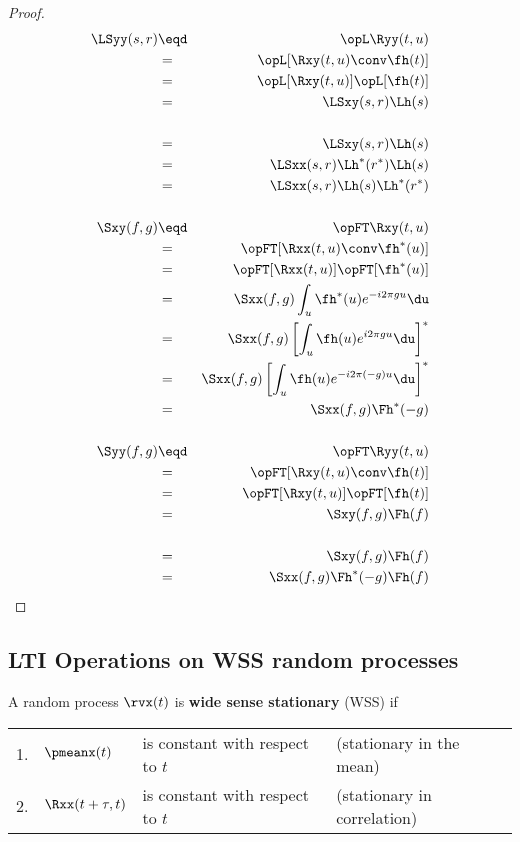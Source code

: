 \begin{proof}
\begin{eqnarray*}
   \LSyy(s,r)
     &\eqd& \opL\Ryy(t,u)
   \\&=&    \opL[\Rxy(t,u) \conv \fh(t)]
   \\&=&    \opL[\Rxy(t,u)]\opL[\fh(t)]
   \\&=&    \LSxy(s,r) \Lh(s)
\\
   \\&=&    \LSxy(s,r) \Lh(s)
   \\&=&    \LSxx(s,r) \Lh^\ast(r^\ast)\Lh(s)
   \\&=&    \LSxx(s,r) \Lh(s) \Lh^\ast(r^\ast)
\\ \\
   \Sxy(f,g)
     &\eqd& \opFT\Rxy(t,u)
   \\&=&    \opFT[\Rxx(t,u) \conv \fh^\ast(u)]
   \\&=&    \opFT[\Rxx(t,u)]\opFT[\fh^\ast(u)]
   \\&=&    \Sxx(f,g) \int_u \fh^\ast(u) e^{-i2\pi g u} \du
   \\&=&    \Sxx(f,g) \left[\int_u \fh(u) e^{i2\pi g u} \du \right]^\ast
   \\&=&    \Sxx(f,g) \left[\int_u \fh(u) e^{-i2\pi(-g)u} \du \right]^\ast
   \\&=&    \Sxx(f,g) \Fh^\ast(-g)
\\ \\
   \Syy(f,g)
     &\eqd& \opFT\Ryy(t,u)
   \\&=&    \opFT[\Rxy(t,u) \conv \fh(t)]
   \\&=&    \opFT[\Rxy(t,u)]\opFT[\fh(t)]
   \\&=&    \Sxy(f,g) \Fh(f)
\\
   \\&=&    \Sxy(f,g) \Fh(f)
   \\&=&    \Sxx(f,g) \Fh^\ast(-g) \Fh(f)
\end{eqnarray*}
\end{proof}


\subsection{LTI Operations on WSS random processes}
\begin{definition}
\label{def:wss}
A random process $\rvx(t)$ is \textbf{wide sense stationary} (WSS) if

\begin{tabular}{llll}
   1. & $\pmeanx(t)$         & is constant with respect to $t$ & (stationary in the mean) \\
   2. & $\Rxx(t+\tau,t)$ & is constant with respect to $t$ & (stationary in correlation)
\end{tabular}
\end{definition}

